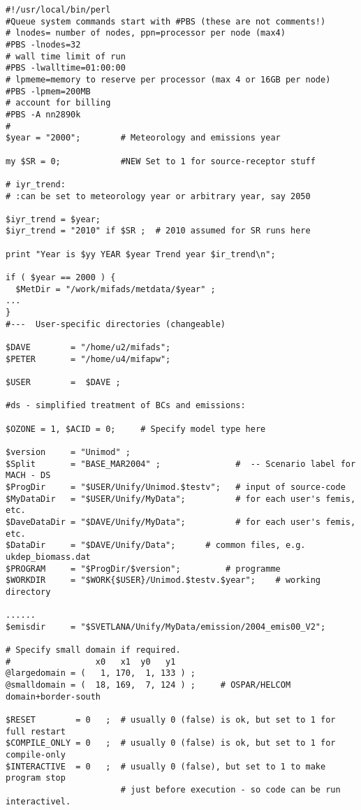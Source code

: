 \begin{verbatim}
#!/usr/local/bin/perl
#Queue system commands start with #PBS (these are not comments!)
# lnodes= number of nodes, ppn=processor per node (max4)
#PBS -lnodes=32
# wall time limit of run
#PBS -lwalltime=01:00:00
# lpmeme=memory to reserve per processor (max 4 or 16GB per node)
#PBS -lpmem=200MB
# account for billing
#PBS -A nn2890k
#
$year = "2000";        # Meteorology and emissions year

my $SR = 0;            #NEW Set to 1 for source-receptor stuff

# iyr_trend:
# :can be set to meteorology year or arbitrary year, say 2050

$iyr_trend = $year;  
$iyr_trend = "2010" if $SR ;  # 2010 assumed for SR runs here

print "Year is $yy YEAR $year Trend year $ir_trend\n";

if ( $year == 2000 ) {
  $MetDir = "/work/mifads/metdata/$year" ;
...
}
#---  User-specific directories (changeable)

$DAVE        = "/home/u2/mifads";      
$PETER       = "/home/u4/mifapw";      

$USER        =  $DAVE ;      

#ds - simplified treatment of BCs and emissions:

$OZONE = 1, $ACID = 0;     # Specify model type here

$version     = "Unimod" ;  
$Split       = "BASE_MAR2004" ;               #  -- Scenario label for MACH - DS
$ProgDir     = "$USER/Unify/Unimod.$testv";   # input of source-code
$MyDataDir   = "$USER/Unify/MyData";          # for each user's femis, etc.
$DaveDataDir = "$DAVE/Unify/MyData";          # for each user's femis, etc.
$DataDir     = "$DAVE/Unify/Data";      # common files, e.g. ukdep_biomass.dat
$PROGRAM     = "$ProgDir/$version";         # programme
$WORKDIR     = "$WORK{$USER}/Unimod.$testv.$year";    # working directory

......
$emisdir     = "$SVETLANA/Unify/MyData/emission/2004_emis00_V2";

# Specify small domain if required. 
#                 x0   x1  y0   y1
@largedomain = (   1, 170,  1, 133 ) ;
@smalldomain = (  18, 169,  7, 124 ) ;     # OSPAR/HELCOM domain+border-south

$RESET        = 0   ;  # usually 0 (false) is ok, but set to 1 for full restart
$COMPILE_ONLY = 0   ;  # usually 0 (false) is ok, but set to 1 for compile-only
$INTERACTIVE  = 0   ;  # usually 0 (false), but set to 1 to make program stop
                       # just before execution - so code can be run interactivel.


\end{verbatim}
